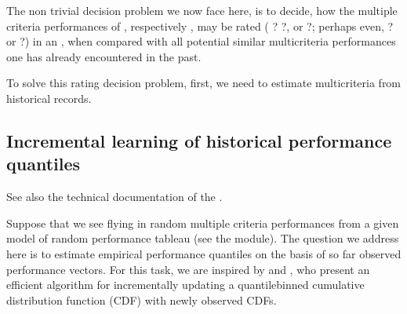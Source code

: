 \documentclass[a4paper,10pt,english]{sphinxhowto}
\begin{document}
The non trivial decision problem we now face here, is to decide, how the multiple criteria performances of , respectively ,  may be rated ( ?  ?, or  ?; perhaps even,  ? or  ?) in an , when compared with all potential similar multi\sphinxhyphen{}criteria performances one has already encountered in the past.

To solve this  rating decision problem, first, we need to estimate multi\sphinxhyphen{}criteria  from historical records.


\subsection{Incremental learning of historical performance quantiles}
\label{\detokenize{tutorial:incremental-learning-of-historical-performance-quantiles}}
See also the technical documentation of the .

Suppose that we see flying in random multiple criteria performances from a given model of random performance tableau (see the  module). The question we address here is to estimate empirical performance quantiles on the basis of so far observed performance vectors. For this task, we are inspired by  and , who present an efficient algorithm for incrementally updating a quantile\sphinxhyphen{}binned cumulative distribution function (CDF) with newly observed CDFs.
\end{document}
